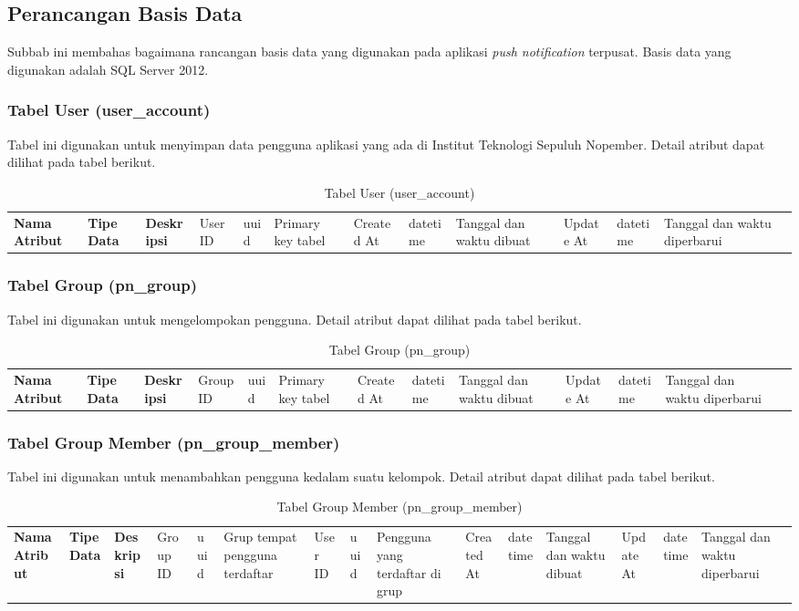 \subsection{Perancangan Basis Data}
\par Subbab ini membahas bagaimana rancangan basis data yang digunakan pada aplikasi \textit{push notification}
terpusat.
Basis data yang digunakan adalah SQL Server 2012.

\subsubsection{Tabel User (user\_account)}
\par Tabel ini digunakan untuk menyimpan data pengguna aplikasi yang ada di Institut Teknologi Sepuluh Nopember. Detail atribut dapat dilihat pada tabel berikut.
\begin{longtable}{|p{2.5cm}|p{2cm}|p{4.5cm}|}
    \hline
    \textbf{Nama Atribut} & \textbf{Tipe Data} & \textbf{Deskripsi} & \hline
    User ID & uuid & Primary key tabel & \hline
    Created At & datetime & Tanggal dan waktu dibuat & \hline
    Update At & datetime & Tanggal dan waktu diperbarui & \hline
    \caption{Tabel User (user\_account)}
\end{longtable}

\subsubsection{Tabel Group (pn\_group)}
\par Tabel ini digunakan untuk mengelompokan pengguna. Detail atribut dapat dilihat pada tabel berikut.
\begin{longtable}{|p{2.5cm}|p{2cm}|p{4.5cm}|}
    \hline
    \textbf{Nama Atribut} & \textbf{Tipe Data} & \textbf{Deskripsi} & \hline
    Group ID & uuid & Primary key tabel & \hline
    Created At & datetime & Tanggal dan waktu dibuat & \hline
    Update At & datetime & Tanggal dan waktu diperbarui & \hline
    \caption{Tabel Group (pn\_group)}
\end{longtable}

\subsubsection{Tabel Group Member (pn\_group\_member)}
\par Tabel ini digunakan untuk menambahkan pengguna kedalam suatu kelompok. Detail atribut dapat dilihat pada tabel berikut.
\begin{longtable}{|p{2.5cm}|p{2cm}|p{4.5cm}|}
    \hline
    \textbf{Nama Atribut} & \textbf{Tipe Data} & \textbf{Deskripsi} & \hline
    Group ID & uuid & Grup tempat pengguna terdaftar & \hline
    User ID & uuid & Pengguna yang terdaftar di grup & \hline
    Created At & datetime & Tanggal dan waktu dibuat & \hline
    Update At & datetime & Tanggal dan waktu diperbarui & \hline
    \caption{Tabel Group Member (pn\_group\_member)}
\end{longtable}

